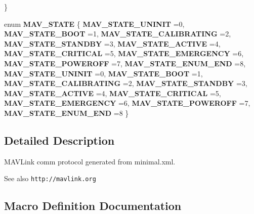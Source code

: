\begin{DoxyCompactItemize}
 \}
\item 
enum \textbf{ M\+A\+V\+\_\+\+S\+T\+A\+TE} \{ \newline
\textbf{ M\+A\+V\+\_\+\+S\+T\+A\+T\+E\+\_\+\+U\+N\+I\+N\+IT} =0, 
\textbf{ M\+A\+V\+\_\+\+S\+T\+A\+T\+E\+\_\+\+B\+O\+OT} =1, 
\textbf{ M\+A\+V\+\_\+\+S\+T\+A\+T\+E\+\_\+\+C\+A\+L\+I\+B\+R\+A\+T\+I\+NG} =2, 
\textbf{ M\+A\+V\+\_\+\+S\+T\+A\+T\+E\+\_\+\+S\+T\+A\+N\+D\+BY} =3, 
\newline
\textbf{ M\+A\+V\+\_\+\+S\+T\+A\+T\+E\+\_\+\+A\+C\+T\+I\+VE} =4, 
\textbf{ M\+A\+V\+\_\+\+S\+T\+A\+T\+E\+\_\+\+C\+R\+I\+T\+I\+C\+AL} =5, 
\textbf{ M\+A\+V\+\_\+\+S\+T\+A\+T\+E\+\_\+\+E\+M\+E\+R\+G\+E\+N\+CY} =6, 
\textbf{ M\+A\+V\+\_\+\+S\+T\+A\+T\+E\+\_\+\+P\+O\+W\+E\+R\+O\+FF} =7, 
\newline
\textbf{ M\+A\+V\+\_\+\+S\+T\+A\+T\+E\+\_\+\+E\+N\+U\+M\+\_\+\+E\+ND} =8, 
\textbf{ M\+A\+V\+\_\+\+S\+T\+A\+T\+E\+\_\+\+U\+N\+I\+N\+IT} =0, 
\textbf{ M\+A\+V\+\_\+\+S\+T\+A\+T\+E\+\_\+\+B\+O\+OT} =1, 
\textbf{ M\+A\+V\+\_\+\+S\+T\+A\+T\+E\+\_\+\+C\+A\+L\+I\+B\+R\+A\+T\+I\+NG} =2, 
\newline
\textbf{ M\+A\+V\+\_\+\+S\+T\+A\+T\+E\+\_\+\+S\+T\+A\+N\+D\+BY} =3, 
\textbf{ M\+A\+V\+\_\+\+S\+T\+A\+T\+E\+\_\+\+A\+C\+T\+I\+VE} =4, 
\textbf{ M\+A\+V\+\_\+\+S\+T\+A\+T\+E\+\_\+\+C\+R\+I\+T\+I\+C\+AL} =5, 
\textbf{ M\+A\+V\+\_\+\+S\+T\+A\+T\+E\+\_\+\+E\+M\+E\+R\+G\+E\+N\+CY} =6, 
\newline
\textbf{ M\+A\+V\+\_\+\+S\+T\+A\+T\+E\+\_\+\+P\+O\+W\+E\+R\+O\+FF} =7, 
\textbf{ M\+A\+V\+\_\+\+S\+T\+A\+T\+E\+\_\+\+E\+N\+U\+M\+\_\+\+E\+ND} =8
 \}
\end{DoxyCompactItemize}


\subsection{Detailed Description}
M\+A\+V\+Link comm protocol generated from minimal.\+xml. 

\begin{DoxySeeAlso}{See also}
{\tt http\+://mavlink.\+org} 
\end{DoxySeeAlso}


\subsection{Macro Definition Documentation}
\mbox{\label{minimal_8h_a2e111ba3d51671c7c15302296b1637a3}} 
